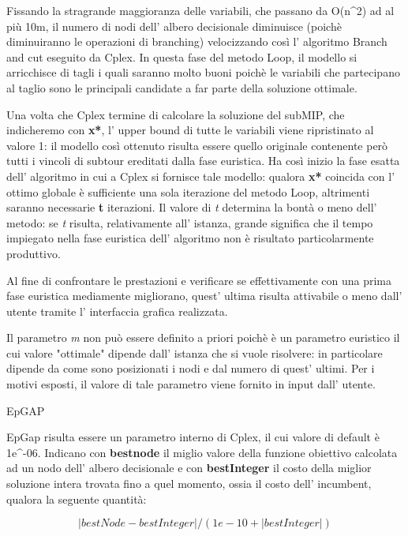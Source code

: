 \documentclass[11pt]{article}
\begin{document}
Fissando la stragrande maggioranza delle variabili, che passano da O(n^2) ad al più 10m, il numero di nodi dell' albero decisionale diminuisce (poichè diminuiranno le operazioni di branching) velocizzando così l' algoritmo Branch and cut eseguito da Cplex. In questa fase del metodo Loop, il modello si arricchisce di tagli i quali saranno molto buoni poichè le variabili che partecipano al taglio sono le principali candidate a far parte della soluzione ottimale. 

Una volta che Cplex termine di calcolare la soluzione del subMIP, che indicheremo con \textbf{x*}, l' upper bound di tutte le variabili viene ripristinato al valore 1: il modello così ottenuto risulta essere quello originale contenente però tutti i vincoli di subtour ereditati dalla fase euristica. Ha così inizio la fase esatta dell' algoritmo in cui a Cplex si fornisce tale modello: qualora \textbf{x*} coincida con l' ottimo globale è sufficiente una sola iterazione del metodo Loop, altrimenti saranno necessarie \textbf{t} iterazioni. Il valore di \textit{t} determina la bontà o meno dell' metodo: se \textit{t} risulta, relativamente all' istanza,  grande significa che il tempo impiegato nella fase euristica dell' algoritmo non è risultato particolarmente produttivo. 

Al fine di confrontare le prestazioni e verificare se effettivamente con una prima fase euristica mediamente migliorano, quest' ultima risulta attivabile o meno dall' utente tramite l' interfaccia grafica realizzata.

Il parametro \textit{m} non può essere definito a priori poichè è un parametro euristico il cui valore "ottimale" dipende dall' istanza che si vuole risolvere: in particolare dipende da come sono posizionati i nodi e dal numero di quest' ultimi. Per i motivi esposti, il valore di tale parametro viene fornito in input dall' utente. 

\vspace{2\baselineskip} 
EpGAP 
\vspace{2\baselineskip} 

EpGap risulta essere un parametro interno di Cplex, il cui valore di default è 1e^{-06}. Indicano con \textbf{bestnode} il miglio valore della funzione obiettivo calcolata ad un nodo dell' albero decisionale e con \textbf{bestInteger} il costo della miglior soluzione intera trovata fino a quel momento, ossia il costo dell' incumbent, qualora la seguente quantità:

$$|bestNode - bestInteger|/(1e-10 + |bestInteger|)$$
\end{document}

